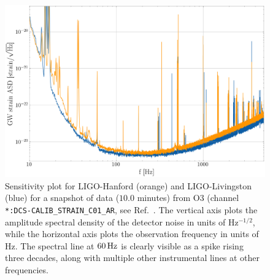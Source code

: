 \documentclass[pra,superscriptaddress,reprint,amsmath,amssymb,nofootinbib]{revtex4-2}
\begin{document}
\begin{figure}
	\begin{center}
		\includegraphics[width=\columnwidth]{images/sensitivity}
	\end{center}
	\caption{Sensitivity plot for LIGO-Hanford (orange) and LIGO-Livingston (blue) for a snapshot of data ($10.0$ minutes) from O3 (channel \texttt{*:DCS-CALIB\_STRAIN\_C01\_AR}, see Ref.~\cite{LIGO_O3, GWOSC:online}. The vertical axis plots the amplitude spectral density of the detector noise in units of Hz$^{-1/2}$, while the horizontal axis plots the observation frequency in units of Hz. The spectral line at $60\,{\rm Hz}$ is clearly visible as a spike rising three decades, along with multiple other instrumental lines at other frequencies.}\label{fig:strainSensitivity}
\end{figure}
\end{document}
